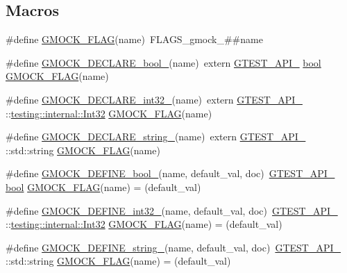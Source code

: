 \subsection*{Macros}
\begin{DoxyCompactItemize}
\item 
\#define \hyperlink{gmock-port_8h_ad7119adfef06be5e7b1551633f5a1436}{G\+M\+O\+C\+K\+\_\+\+F\+L\+AG}(name)~F\+L\+A\+G\+S\+\_\+gmock\+\_\+\#\#name
\item 
\#define \hyperlink{gmock-port_8h_a7a0a953221ea8ef5aaa6c644a48af599}{G\+M\+O\+C\+K\+\_\+\+D\+E\+C\+L\+A\+R\+E\+\_\+bool\+\_\+}(name)~extern \hyperlink{gtest-port_8h_aa73be6f0ba4a7456180a94904ce17790}{G\+T\+E\+S\+T\+\_\+\+A\+P\+I\+\_\+} \hyperlink{classbool}{bool} \hyperlink{gmock-port_8h_ad7119adfef06be5e7b1551633f5a1436}{G\+M\+O\+C\+K\+\_\+\+F\+L\+AG}(name)
\item 
\#define \hyperlink{gmock-port_8h_adeb7f0a8d842d1d541615763835af3f9}{G\+M\+O\+C\+K\+\_\+\+D\+E\+C\+L\+A\+R\+E\+\_\+int32\+\_\+}(name)~extern \hyperlink{gtest-port_8h_aa73be6f0ba4a7456180a94904ce17790}{G\+T\+E\+S\+T\+\_\+\+A\+P\+I\+\_\+} \+::\hyperlink{namespacetesting_1_1internal_a8ee38faaf875f133358abaf9bc056cec}{testing\+::internal\+::\+Int32} \hyperlink{gmock-port_8h_ad7119adfef06be5e7b1551633f5a1436}{G\+M\+O\+C\+K\+\_\+\+F\+L\+AG}(name)
\item 
\#define \hyperlink{gmock-port_8h_a35af08c45131cf68d78446cb8cfe40fe}{G\+M\+O\+C\+K\+\_\+\+D\+E\+C\+L\+A\+R\+E\+\_\+string\+\_\+}(name)~extern \hyperlink{gtest-port_8h_aa73be6f0ba4a7456180a94904ce17790}{G\+T\+E\+S\+T\+\_\+\+A\+P\+I\+\_\+} \+::std\+::string \hyperlink{gmock-port_8h_ad7119adfef06be5e7b1551633f5a1436}{G\+M\+O\+C\+K\+\_\+\+F\+L\+AG}(name)
\item 
\#define \hyperlink{gmock-port_8h_a470be328fabbeef3987127adc18a1433}{G\+M\+O\+C\+K\+\_\+\+D\+E\+F\+I\+N\+E\+\_\+bool\+\_\+}(name,  default\+\_\+val,  doc)~\hyperlink{gtest-port_8h_aa73be6f0ba4a7456180a94904ce17790}{G\+T\+E\+S\+T\+\_\+\+A\+P\+I\+\_\+} \hyperlink{classbool}{bool} \hyperlink{gmock-port_8h_ad7119adfef06be5e7b1551633f5a1436}{G\+M\+O\+C\+K\+\_\+\+F\+L\+AG}(name) = (default\+\_\+val)
\item 
\#define \hyperlink{gmock-port_8h_a19d91081ff0aaab2f60ef1dc2d6e6b34}{G\+M\+O\+C\+K\+\_\+\+D\+E\+F\+I\+N\+E\+\_\+int32\+\_\+}(name,  default\+\_\+val,  doc)~\hyperlink{gtest-port_8h_aa73be6f0ba4a7456180a94904ce17790}{G\+T\+E\+S\+T\+\_\+\+A\+P\+I\+\_\+} \+::\hyperlink{namespacetesting_1_1internal_a8ee38faaf875f133358abaf9bc056cec}{testing\+::internal\+::\+Int32} \hyperlink{gmock-port_8h_ad7119adfef06be5e7b1551633f5a1436}{G\+M\+O\+C\+K\+\_\+\+F\+L\+AG}(name) = (default\+\_\+val)
\item 
\#define \hyperlink{gmock-port_8h_ad6badbf90e5a813e2bd5668fc6b6a8f7}{G\+M\+O\+C\+K\+\_\+\+D\+E\+F\+I\+N\+E\+\_\+string\+\_\+}(name,  default\+\_\+val,  doc)~\hyperlink{gtest-port_8h_aa73be6f0ba4a7456180a94904ce17790}{G\+T\+E\+S\+T\+\_\+\+A\+P\+I\+\_\+} \+::std\+::string \hyperlink{gmock-port_8h_ad7119adfef06be5e7b1551633f5a1436}{G\+M\+O\+C\+K\+\_\+\+F\+L\+AG}(name) = (default\+\_\+val)
\end{DoxyCompactItemize}


